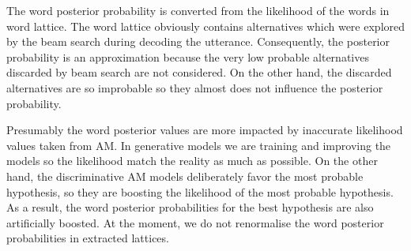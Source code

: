 
The word posterior probability is converted from the likelihood of the words in word lattice. 
The word lattice obviously contains alternatives which were explored by the beam search during decoding the utterance.
Consequently, the posterior probability is an approximation because the very low probable alternatives discarded by beam search are not considered.
On the other hand, the discarded alternatives are so improbable so they almost does not influence the posterior probability.

Presumably the word posterior values are more impacted by inaccurate likelihood values taken from \acl{AM}.
In generative models we are training and improving the models so the likelihood match the reality as much as possible.
On the other hand, the discriminative \ac{AM} models deliberately favor the most probable hypothesis, so they are boosting the likelihood of the most probable hypothesis.
As a result, the word posterior probabilities for the best hypothesis are also artificially boosted.
At the moment, we do not renormalise the word posterior probabilities in extracted lattices.

